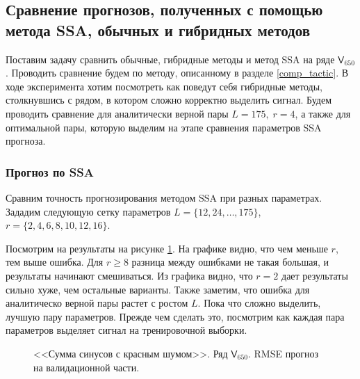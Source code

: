 \documentclass[specialist,
               substylefile = spbu.rtx,
               subf,href,colorlinks=true, 12p]{disser}
\begin{document}
\subsection{Сравнение прогнозов, полученных с помощью метода SSA, обычных и гибридных методов}
\label{serr}

Поставим задачу сравнить обычные, гибридные методы и метод SSA на ряде $\mathsf{V}_{650}$. Проводить сравнение будем по методу, описанному в разделе \ref{comp_tactic}. В ходе эксперимента хотим посмотреть как поведут себя гибридные методы, столкнувшись с рядом, в котором сложно корректно выделить сигнал. Будем проводить сравнение для аналитически верной пары $L = 175, \; r = 4$, а также для оптимальной пары, которую выделим на этапе сравнения параметров SSA прогноза.

\subsubsection{Прогноз по SSA}
Сравним точность прогнозирования методом SSA при разных параметрах. Зададим следующую сетку параметров $L = \{ 12, 24, \ldots, 175 \}$, $r = \{ 2, 4, 6, 8, 10, 12, 16 \}$.

Посмотрим на результаты на рисунке \ref{serr_ssa_forecast}. На графике видно, что чем меньше $r$, тем выше ошибка. Для $r \geqslant 8$ разница между ошибками не такая большая, и результаты начинают смешиваться. Из графика видно, что $r = 2$ дает результаты сильно хуже, чем остальные варианты. Также заметим, что ошибка для аналитическо верной пары растет с ростом $L$. Пока что сложно выделить, лучшую пару параметров. Прежде чем сделать это, посмотрим как каждая пара параметров выделяет сигнал на тренировочной выборки.

\begin{figure}[H]
	\captionsetup{justification=centering}
	\caption{<<Сумма синусов с красным шумом>>. Ряд $\mathsf{V}_{650}$. RMSE прогноз на валидационной части.}
	\label{serr_ssa_forecast}
\end{figure}
\end{document}
